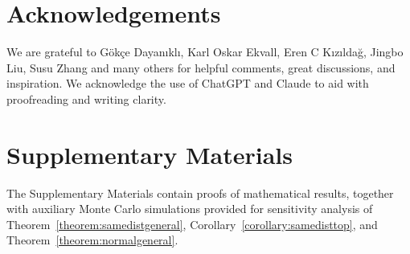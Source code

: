 \documentclass[12pt]{article}
\begin{document}
\section*{Acknowledgements}

We are grateful to G\"ok\c{c}e Dayan\i kl\i, Karl Oskar Ekvall, Eren C K\i z\i lda\u{g}, Jingbo Liu, Susu Zhang and many others for helpful comments, great discussions, and inspiration. We acknowledge the use of ChatGPT and Claude to aid with proofreading and writing clarity. 


\section*{Supplementary Materials}

The Supplementary Materials contain proofs of mathematical results, together with auxiliary Monte Carlo simulations provided for sensitivity analysis of Theorem~\ref{theorem:samedistgeneral}, Corollary~\ref{corollary:samedisttop}, and Theorem~\ref{theorem:normalgeneral}.



\end{document}
